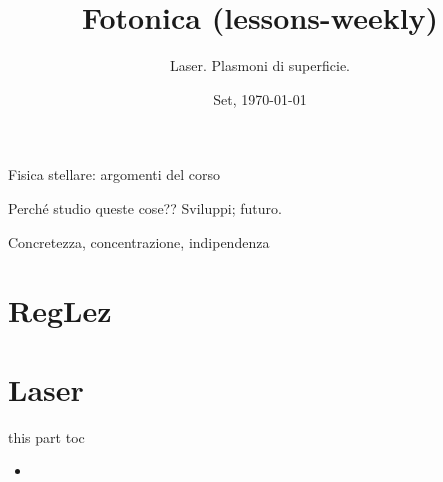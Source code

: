 \documentclass[10pt,xcolor={usenames},fleqn,mathserif,serif]{beamer}
\title{Fotonica (lessons-weekly)}
\subtitle{Laser. Plasmoni di superficie.}
\date{Set, \today}
\begin{document}


\begin{frame}
  \titlepage
\end{frame}


\begin{frame}[label={argomenti}]{Fisica stellare: argomenti del corso}
\tableofcontents[onlyparts]
\end{frame}

\begin{wordonframe}{Perch\'e studio queste cose?? Sviluppi; futuro.}

Concretezza, concentrazione, indipendenza

\end{wordonframe}

\part{RegLez}\label{part:intro}


\part{Laser}\label{part:laser}

\begin{frame}{this part toc}
\begin{itemize}
\item 
\end{itemize}
\end{frame}
\end{document}
